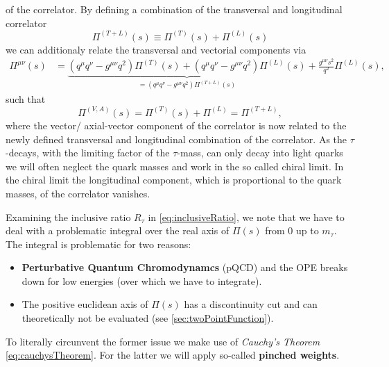 \documentclass[../../index.tex]{subfiles}
\begin{document}
of the correlator. By defining a combination of the transversal and longitudinal
correlator
\begin{equation}
  \label{eq:correlatorCombination}
  \Pi^{(T+L)}(s) \equiv \Pi^{(T)}(s) + \Pi^{(L)}(s)
\end{equation}
we can additionaly relate the transversal and vectorial components via
\begin{equation}
  \label{eq:longitudinalCorrelator}
  \begin{split}
    \Pi^{\mu\nu}(s) &= \underbrace{(q^\mu q^\nu - g^{\mu\nu}q^2)\Pi^{(T)}(s) + (q^\mu q^\nu - g^{\mu\nu} q^2)\Pi^{(L)}(s)}_{=(q^\mu q^\nu - g^{\mu\nu} q^2) \Pi^{(T+L)}(s)} + \frac{g^{\mu\nu}s^2}{q^2}\Pi^{(L)}(s),
  \end{split} 
\end{equation}
such that
\begin{equation}
  \Pi^{(V,A)}(s) = \Pi^{(T)}(s) + \Pi^{(L)} = \Pi^{(T+L)},
\end{equation}
where the vector/ axial-vector component of the correlator is now related to the
newly defined transversal and longitudinal combination of the correlator. As the
$\tau$-decays, with the limiting factor of the $\tau$-mass, can only decay into
light quarks we will often neglect the quark masses and work in the so called
chiral limit. In the chiral limit the longitudinal component, which is 
proportional to the quark masses, of the correlator vanishes.  

Examining the inclusive ratio $R_\tau$ in \cref{eq:inclusiveRatio}, we note that
we have to deal with a problematic integral over the real axis of $\Pi(s)$ from
$0$ up to $m_\tau$. The integral is problematic for two reasons:
\begin{itemize}
  \item \textbf{Perturbative Quantum Chromodynamcs} (pQCD) and the OPE breaks down for low
    energies (over which we have to integrate).
  \item The positive euclidean axis of $\Pi(s)$ has a discontinuity cut and can
    theoretically not be evaluated (see \cref{sec:twoPointFunction}).
\end{itemize}
To literally circunvent the former issue we make use of \textit{Cauchy's Theorem}
\cref{eq:cauchysTheorem}. For the latter we will apply so-called \textbf{pinched weights}.
\end{document}
